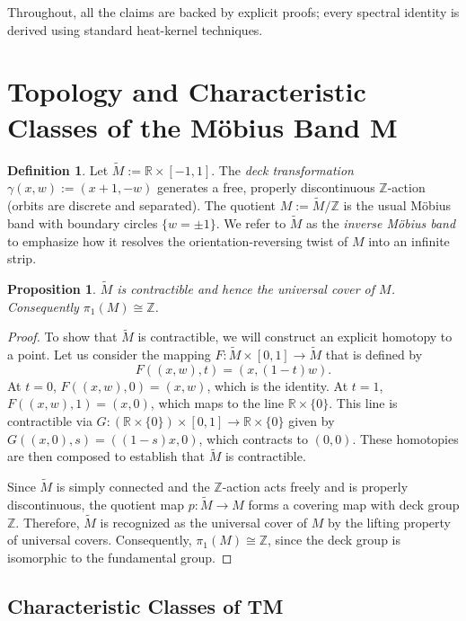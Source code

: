 \documentclass[11pt]{amsart}
\newtheorem{proposition}[theorem]{Proposition}
\theoremstyle{definition}
\newtheorem{definition}[theorem]{Definition}
\theoremstyle{remark}
\newcommand{\RR}{\mathbb{R}}
\newcommand{\ZZ}{\mathbb{Z}}
\newcommand{\wt}{\widetilde}
\begin{document}
Throughout, all the claims are backed by explicit proofs; every spectral identity is derived using standard heat-kernel techniques.

\section{Topology and Characteristic Classes of the Möbius Band M}

\begin{definition}
\label{def:invM}
Let $\wt M:=\RR\times[-1,1]$.  The \emph{deck transformation}
\(
\gamma(x,w):=(x+1,-w)
\)
generates a free, properly discontinuous $\ZZ$-action (orbits are discrete and separated).  The quotient
\(M:=\wt M/\ZZ\)
is the usual Möbius band with boundary circles $\{w=\pm1\}$. We refer to $\wt M$ as the \emph{inverse Möbius band} to emphasize how it resolves the orientation-reversing twist of $M$ into an infinite strip.
\end{definition}

\begin{proposition}\label{prop:universalCov}
$\wt M$ is contractible and hence the universal cover of $M$.  Consequently $\pi_1(M)\cong\ZZ$.
\end{proposition}

\begin{proof}
To show that $\wt M$ is contractible, we will construct an explicit homotopy to a point.  Let us consider the mapping $F: \wt M \times [0,1] \to \wt M$ that is defined by
\[
F((x,w), t) = (x, (1-t)w).
\]
At $t=0$, $F((x,w),0) = (x,w)$, which is the identity.  At $t=1$, $F((x,w),1) = (x,0)$, which maps to the line $\RR \times \{0\}$.  This line is contractible via $G: (\RR \times \{0\}) \times [0,1] \to \RR \times \{0\}$ given by $G((x,0), s) = ( (1-s)x, 0 )$, which contracts to $(0,0)$.  These homotopies are then composed to establish that $\wt M$ is contractible.

Since $\wt M$ is simply connected and the $\ZZ$-action acts freely and is properly discontinuous, the quotient map $p: \wt M \to M$ forms a covering map with deck group $\ZZ$. Therefore, $\wt M$ is recognized as the universal cover of $M$ by the lifting property of universal covers. Consequently, $\pi_1(M) \cong \ZZ$, since the deck group is isomorphic to the fundamental group.
\end{proof}

\subsection{Characteristic Classes of TM}
\end{document}
